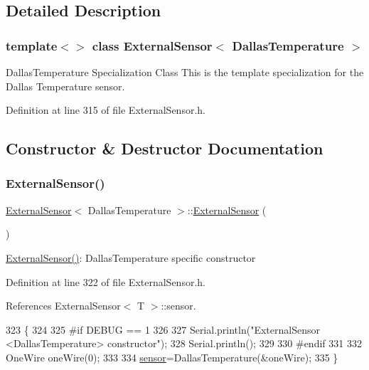 \subsection{Detailed Description}
\subsubsection*{template$<$$>$\newline
class External\+Sensor$<$ Dallas\+Temperature $>$}

Dallas\+Temperature Specialization Class This is the template specialization for the Dallas Temperature sensor. 

Definition at line 315 of file External\+Sensor.\+h.



\subsection{Constructor \& Destructor Documentation}
\mbox{\label{classExternalSensor_3_01DallasTemperature_01_4_ad290681e8780cdf1870416eee99d699d}} 
\subsubsection{\texorpdfstring{External\+Sensor()}{ExternalSensor()}}
{\footnotesize\ttfamily \hyperlink{classExternalSensor}{External\+Sensor}$<$ Dallas\+Temperature $>$\+::\hyperlink{classExternalSensor}{External\+Sensor} (\begin{DoxyParamCaption}{ }\end{DoxyParamCaption})\hspace{0.3cm}{\ttfamily [inline]}}

\hyperlink{classExternalSensor_3_01DallasTemperature_01_4_ad290681e8780cdf1870416eee99d699d}{External\+Sensor()}\+: Dallas\+Temperature specific constructor 

Definition at line 322 of file External\+Sensor.\+h.



References External\+Sensor$<$ T $>$\+::sensor.


\begin{DoxyCode}
323     \{
324         
325 \textcolor{preprocessor}{    #if DEBUG == 1 }
326 
327         Serial.println(\textcolor{stringliteral}{"ExternalSensor <DallasTemperature> constructor"});
328         Serial.println();
329     
330 \textcolor{preprocessor}{    #endif}
331 
332         OneWire oneWire(0);
333         
334         \hyperlink{classExternalSensor_3_01DallasTemperature_01_4_adb6ba4fcdedef95ad8f6b0c9b6c0f9d1}{sensor}=DallasTemperature(&oneWire);
335     \}
\end{DoxyCode}


